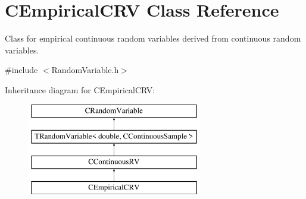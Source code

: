 \hypertarget{class_c_empirical_c_r_v}{\section{C\-Empirical\-C\-R\-V Class Reference}
\label{class_c_empirical_c_r_v}
}


Class for empirical continuous random variables derived from continuous random variables.  




{\ttfamily \#include $<$Random\-Variable.\-h$>$}

Inheritance diagram for C\-Empirical\-C\-R\-V\-:\begin{figure}[H]
\begin{center}
\leavevmode
\includegraphics[height=4.000000cm]{class_c_empirical_c_r_v}
\end{center}
\end{figure}
